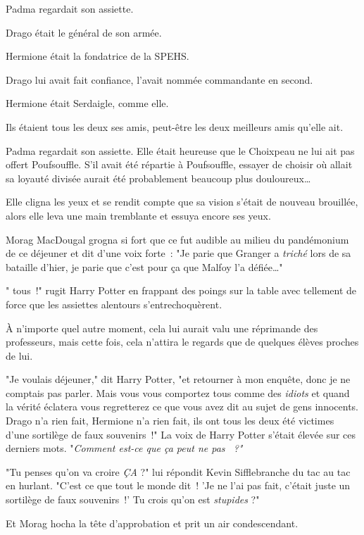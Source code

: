 Padma regardait son assiette.

Drago était le général de son armée.

Hermione était la fondatrice de la SPEHS.

Drago lui avait fait confiance, l'avait nommée commandante en second.

Hermione était Serdaigle, comme elle.

Ils étaient tous les deux ses amis, peut-être les deux meilleurs amis qu'elle ait.

Padma regardait son assiette. Elle était heureuse que le Choixpeau ne lui ait pas offert Poufsouffle. S'il avait été répartie à Poufsouffle, essayer de choisir où allait sa loyauté divisée aurait été probablement beaucoup plus douloureux…

Elle cligna les yeux et se rendit compte que sa vision s'était de nouveau brouillée, alors elle leva une main tremblante et essuya encore ses yeux.

Morag MacDougal grogna si fort que ce fut audible au milieu du pandémonium de ce déjeuner et dit d'une voix forte~: "Je parie que Granger a \emph{triché} lors de sa bataille d'hier, je parie que c'est pour ça que Malfoy l'a défiée…"

" tous~!" rugit Harry Potter en frappant des poings sur la table avec tellement de force que les assiettes alentours s'entrechoquèrent.

À n'importe quel autre moment, cela lui aurait valu une réprimande des professeurs, mais cette fois, cela n'attira le regards que de quelques élèves proches de lui.

"Je voulais déjeuner," dit Harry Potter, "et retourner à mon enquête, donc je ne comptais pas parler. Mais vous vous comportez tous comme des \emph{idiots} et quand la vérité éclatera vous regretterez ce que vous avez dit au sujet de gens innocents. Drago n'a rien fait, Hermione n'a rien fait, ils ont tous les deux été victimes d'une sortilège de faux souvenirs~!" La voix de Harry Potter s'était élevée sur ces derniers mots. "\emph{Comment est-ce que ça peut ne pas ~?"}

"Tu penses qu'on va croire \emph{ÇA} ?" lui répondit Kevin Sifflebranche du tac au tac en hurlant. "C'est ce que tout le monde dit~! 'Je ne l'ai pas fait, c'était juste un sortilège de faux souvenirs~!' Tu crois qu'on est \emph{stupides} ?"

Et Morag hocha la tête d'approbation et prit un air condescendant.

